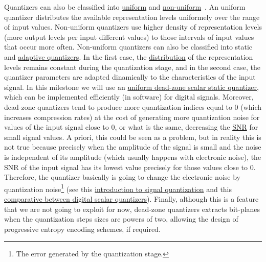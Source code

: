 Quantizers can also be classified into
\href{https://en.wikipedia.org/wiki/Quantization_(signal_processing)#Mid-riser_and_mid-tread_uniform_quantizers}{uniform}
and
\href{https://nptel.ac.in/content/storage2/courses/117104069/chapter_5/5_5.html}{non-uniform}~\cite{sayood2017introduction,vetterli2014foundations}. An
uniform quantizer distributes the available representation levels
uniformely over the range of input values. Non-uniform quantizers use
higher density of representation levels (more output levels per input
different values) to those intervals of input values that occur more
often. Non-uniform quantizers can also be classified into static and
\href{https://en.wikipedia.org/wiki/Adaptive_differential_pulse-code_modulation}{adaptive
  quantizers}. In the first case, the
\href{https://en.wikipedia.org/wiki/Probability_distribution}{distribution}
of the representation levels remains constant during the quantization
stage, and in the second case, the quantizer parameters are adapted
dinamically to the characteristics of the input signal. In this
milestone we will use an
\href{https://en.wikipedia.org/wiki/Quantization_(signal_processing)#Dead-zone_quantizers}{uniform
  dead-zone scalar static quantizer}, which can be implemented
efficiently (in software) for digital signals. Moreover, dead-zone
quantizers tend to produce more quantization indices equal to 0 (which
increases compression rates) at the cost of generating more
quantization noise for values of the input signal close to 0, or what
is the same, decreasing the
\href{https://en.wikipedia.org/wiki/Signal-to-noise_ratio}{SNR} for
small signal values. A priori, this could be seen as a problem, but in
reality this is not true because precisely when the amplitude of the
signal is small and the noise is independent of its amplitude (which
usually happens with electronic noise), the SNR of the input signal
has its lowest value precisely for those values close to 0. Therefore,
the quantizer basically is going to change the electronic noise by
quantization noise\footnote{The error generated by the quantization
  stage.} (see this
\href{https://github.com/vicente-gonzalez-ruiz/signal_quantization}{introduction
  to signal quantization} and this
\href{https://github.com/vicente-gonzalez-ruiz/scalar_quantization}{comparative
  between digital scalar quantizers}). Finally, although this is a
feature that we are not going to exploit for now, dead-zone quantizers
extracts bit-planes when the quantization steps sizes are powers of
two, allowing the design of progressive entropy encoding schemes, if
required.

